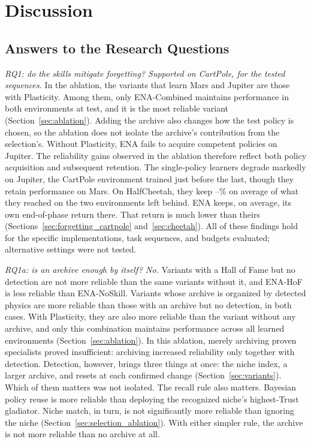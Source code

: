 \section{Discussion}
\label{sec:discussion}

\subsection{Answers to the Research Questions}

\textit{RQ1: do the skills mitigate forgetting? Supported on CartPole, for the tested sequences.} In the ablation, the variants that learn Mars and Jupiter are those with Plasticity. Among them, only ENA-Combined maintains performance in both environments at test, and it is the most reliable variant (Section~\ref{sec:ablation}). Adding the archive also changes how the test policy is chosen, so the ablation does not isolate the archive's contribution from the selection's. Without Plasticity, ENA fails to acquire competent policies on Jupiter. The reliability gains observed in the ablation therefore reflect both policy acquisition and subsequent retention. The single-policy learners degrade markedly on Jupiter, the CartPole environment trained just before the last, though they retain performance on Mars. On HalfCheetah, they keep --\% on average of what they reached on the two environments left behind. ENA keeps, on average, its own end-of-phase return there. That return is much lower than theirs (Sections~\ref{sec:forgetting_cartpole} and~\ref{sec:cheetah}). All of these findings hold for the specific implementations, task sequences, and budgets evaluated; alternative settings were not tested.

\textit{RQ1a: is an archive enough by itself? No.} Variants with a Hall of Fame but no detection are not more reliable than the same variants without it, and ENA-HoF is less reliable than ENA-NoSkill. Variants whose archive is organized by detected physics are more reliable than those with an archive but no detection, in both cases. With Plasticity, they are also more reliable than the variant without any archive, and only this combination maintains performance across all learned environments (Section~\ref{sec:ablation}). In this ablation, merely archiving proven specialists proved insufficient: archiving increased reliability only together with detection. Detection, however, brings three things at once: the niche index, a larger archive, and resets at each confirmed change (Section~\ref{sec:variants}). Which of them matters was not isolated. The recall rule also matters. Bayesian policy reuse is more reliable than deploying the recognized niche's highest-Trust gladiator. Niche match, in turn, is not significantly more reliable than ignoring the niche (Section~\ref{sec:selection_ablation}). With either simpler rule, the archive is not more reliable than no archive at all.

